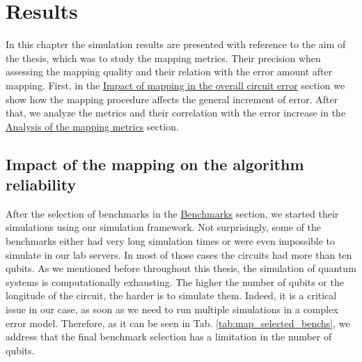 
\chapter{Results}
\label{sec:org1553adf}

In this chapter the simulation results are presented with reference to the aim of the thesis, which was to study the mapping metrics.
Their precision when assessing the mapping quality and their relation with the error amount after mapping.
First, in the \hyperref[sec:orgec7e7e7]{Impact of mapping in the overall circuit error} section we show how the mapping procedure affects the general increment of error.
After that, we analyze the metrics and their correlation with the error increase in the \hyperref[sec:org7e0d207]{Analysis of the mapping metrics} section.

\section{Impact of the mapping on the algorithm reliability}
\label{sec:orgec7e7e7}
After the selection of benchmarks in the \href{chapter-4.org}{Benchmarks} section, we started their simulations using our simulation framework.
Not surprisingly, some of the benchmarks either had very long simulation times or were even impossible to simulate in our lab servers. In most of those cases the circuits had more than ten qubits.
As we mentioned before throughout this thesis, the simulation of quantum systems is computationally exhausting.
The higher the number of qubits or the longitude of the circuit, the harder is to simulate them.
Indeed, it is a critical issue in our case, as soon as we need to run multiple simulations in a complex error model.
Therefore, as it can be seen in Tab. \ref{tab:map_selected_benchs}, we address that the final benchmark selection has a limitation in the number of qubits.

